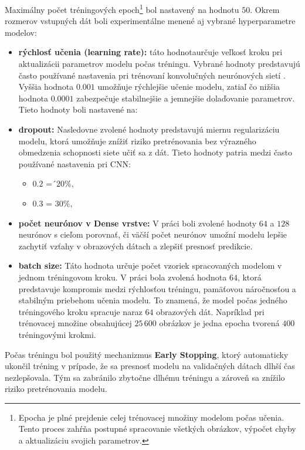 Maximálny počet tréningových epoch\footnote{Epocha je plné prejdenie celej trénovacej množiny modelom počas učenia. Tento proces zahŕňa postupné spracovanie všetkých obrázkov, výpočet chyby a aktualizáciu svojich parametrov.} bol nastavený na hodnotu $50$. Okrem rozmerov vstupných dát boli experimentálne menené aj vybrané hyperparametre modelov:
\begin{itemize}
    \item \textbf{rýchlosť učenia (learning rate):} táto hodnotaurčuje veľkosť kroku pri aktualizácii parametrov modelu 
    počas tréningu. Vybrané hodnoty predstavujú často používané nastavenia pri trénovaní 
    konvolučných neurónových sietí . Vyššia hodnota $0.001$ umožňuje rýchlejšie učenie modelu, 
    zatiaľ čo nižšia hodnota $0.0001$ zabezpečuje stabilnejšie a jemnejšie dolaďovanie parametrov. Tieto hodnoty boli nastavené na:


    \item \textbf{dropout:} Nasledovne zvolené hodnoty predstavujú miernu regularizáciu modelu, 
    ktorá umožňuje znížiť riziko pretrénovania bez výrazného obmedzenia schopnosti siete učiť sa z dát. 
    Tieto hodnoty patria medzi často používané nastavenia pri CNN:
    \begin{itemize}[nolistsep, noitemsep]
        \item $0.2$ =´$20\%$,
        \item $0.3$ = $30\%$,
    \end{itemize}

    \item \textbf{počet neurónov v Dense vrstve:} 
    V práci boli zvolené hodnoty $64$ a $128$ neurónov s 
    cieľom porovnať, či väčší počet neurónov umožní modelu lepšie zachytiť vzťahy v obrazových dátach a 
    zlepšiť presnosť predikcie. 

    \item \textbf{batch size:} Táto hodnota určuje počet vzoriek spracovaných modelom v jednom tréningovom 
    kroku. V práci bola zvolená hodnota $64$, ktorá predstavuje kompromis medzi rýchlosťou tréningu, 
    pamäťovou náročnosťou a stabilným priebehom učenia modelu. To znamená, že model počas jedného 
    tréningového kroku spracuje naraz $64$ obrazových dát. Napríklad pri trénovacej množine 
    obsahujúcej $25\,600$ obrázkov je jedna epocha tvorená $400$ tréningovými krokmi.
\end{itemize}

Počas tréningu bol použitý mechanizmus \textbf{Early Stopping}, ktorý automaticky ukončil tréning v prípade, 
že sa presnosť modelu na validačných dátach dlhší čas nezlepšovala. Tým sa zabránilo zbytočne dlhému tréningu 
a zároveň sa znížilo riziko pretrénovania modelu.

